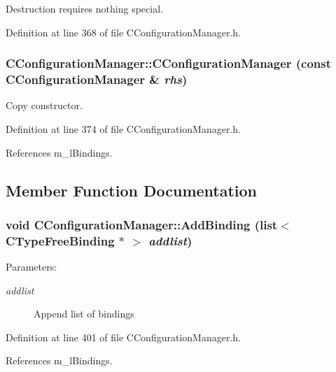 Destruction requires nothing special.



Definition at line 368 of file CConfiguration\-Manager.h.
\subsubsection{\setlength{\rightskip}{0pt plus 5cm}CConfiguration\-Manager::CConfiguration\-Manager (const CConfiguration\-Manager \& {\em rhs})\hspace{0.3cm}{\tt  [inline]}}\label{classCConfigurationManager_a3}


Copy constructor.



Definition at line 374 of file CConfiguration\-Manager.h.

References m\_\-l\-Bindings.

\subsection{Member Function Documentation}
\subsubsection{\setlength{\rightskip}{0pt plus 5cm}void CConfiguration\-Manager::Add\-Binding (list$<$ {\bf CType\-Free\-Binding} $\ast$ $>$ {\em addlist})\hspace{0.3cm}{\tt  [inline]}}\label{classCConfigurationManager_a10}


\begin{Desc}
\item[Parameters: ]\par
\begin{description}
\item[{\em 
addlist}]Append list of bindings \end{description}
\end{Desc}


Definition at line 401 of file CConfiguration\-Manager.h.

References m\_\-l\-Bindings.
